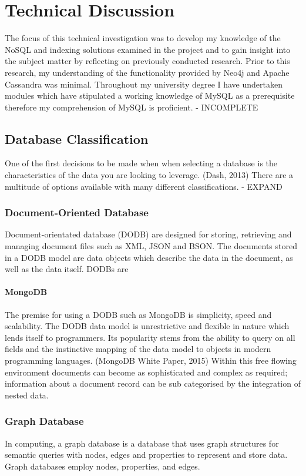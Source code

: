 \chapter{Technical Discussion}
The focus of this technical investigation was to develop my knowledge of the NoSQL and indexing solutions examined in the project and to gain insight into the subject matter by reflecting on previously conducted research. Prior to this research, my understanding of the functionality provided by Neo4j and Apache Cassandra was minimal. Throughout my university degree I have undertaken modules which have stipulated a working knowledge of MySQL as a prerequisite therefore my comprehension of MySQL is proficient. - INCOMPLETE

\section{Database Classification}
One of the first decisions to be made when when selecting a database is the characteristics of the data you are looking to leverage. (Dash, 2013) There are a multitude of options available with many different classifications. - EXPAND

\subsection{Document-Oriented Database}
Document-orientated database (DODB) are designed for storing, retrieving and managing document files such as XML, JSON and BSON. The documents stored in a DODB model are data objects which describe the data in the document, as well as the data itself. DODBs are 
\subsubsection{MongoDB}\label{mongo}
The premise for using a DODB such as MongoDB is simplicity, speed and scalability. The DODB data model is unrestrictive and flexible in nature which lends itself to programmers. Its popularity stems from the ability to query on all fields and the instinctive mapping of the data model to objects in modern programming languages. (MongoDB White Paper, 2015) Within this free flowing environment documents can become as sophisticated and complex as required; information about a document record can be sub categorised by the integration of nested data.

\subsection{Graph Database}
In computing, a graph database is a database that uses graph structures for semantic queries with nodes, edges and properties to represent and store data. Graph databases employ nodes, properties, and edges.

